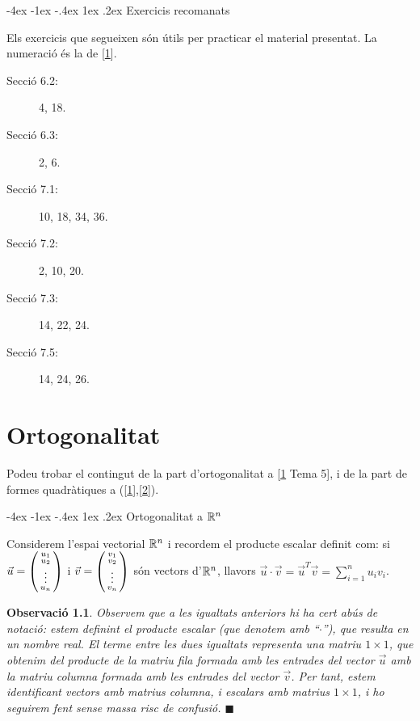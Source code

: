 \documentclass[
  11pt,
]{book}
\makeatletter
\numberwithin{dummy}{section}
\theoremstyle{maincolornumbox}
\newtheorem{remarkT}{Observació}[chapter]
\theoremstyle{blacknumex}
\theoremstyle{blacknumbox}
\theoremstyle{maincolornum}
\newenvironment{remark}{\begin{remarkT}}{\hfill{\tiny\ensuremath{\blacksquare}}\end{remarkT}}
\renewcommand{\section}{\@startsection{section}{1}{\z@}
{-4ex \@plus -1ex \@minus -.4ex}
{1ex \@plus.2ex }
{\normalfont\large\sffamily\bfseries}}
\newlength\esp
\makeatother
\begin{document}
\hypertarget{exercicis-recomanats-2}{%
\section{Exercicis recomanats}\label{exercicis-recomanats-2}}

Els exercicis que segueixen són útils per practicar el material
presentat. La numeració és la de {[}\protect\hyperlink{ref-Bret}{1}{]}.

\begin{description}
\item[Secció 6.2:]
4, 18.
\item[Secció 6.3:]
2, 6.
\item[Secció 7.1:]
10, 18, 34, 36.
\item[Secció 7.2:]
2, 10, 20.
\item[Secció 7.3:]
14, 22, 24.
\item[Secció 7.5:]
14, 24, 26.
\end{description}

\hypertarget{ortogonalitat}{%
\chapter{Ortogonalitat}\label{ortogonalitat}}

Podeu trobar el contingut de la part d'ortogonalitat a {[}\protect\hyperlink{ref-Bret}{1} Tema 5{]}, i
de la part de formes quadràtiques a ({[}\protect\hyperlink{ref-Bret}{1}{]},{[}\protect\hyperlink{ref-NaXa}{2}{]}).

\hypertarget{ortogonalitat-a-rn}{%
\section{\texorpdfstring{Ortogonalitat a \(\mathbb{R}^n\)}{Ortogonalitat a \textbackslash R\^{}n}}\label{ortogonalitat-a-rn}}

Considerem l'espai vectorial \(\mathbb{R}^n\) i recordem el producte escalar
definit com: si \(\vec u=\left(\begin{smallmatrix}u_1\\u_2\\ \vdots\\u_n\end{smallmatrix}\right)\) i
\(\vec v=\left(\begin{smallmatrix}v_1\\v_2\\ \vdots \\ v_n\end{smallmatrix}\right)\) són vectors d'\(\mathbb{R}^n\), llavors
\(\vec u \cdot \vec v = \vec u^T \vec v=\sum_{i=1}^n u_iv_i\).

\begin{remark}
Observem que a les igualtats anteriors hi ha cert abús de notació: estem
definint el producte escalar (que denotem amb ``\(\cdot\)''), que resulta en
un nombre real. El terme entre les dues igualtats representa una matriu
\(1\times 1\), que obtenim del producte de la matriu fila formada amb les
entrades del vector \(\vec u\) amb la matriu columna formada amb les
entrades del vector \(\vec v\). Per tant, estem identificant vectors amb
matrius columna, i escalars amb matrius \(1\times 1\), i ho seguirem fent
sense massa risc de confusió.
\end{remark}
\end{document}
